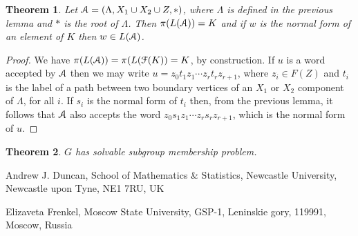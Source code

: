 \documentclass[a4paper,12pt]{article}
\renewcommand{\L}{\Lambda }
\newcommand{\cA}{{\cal{A}}}
\newcommand{\cF}{{\cal{F}}}
\newtheorem{theorem}{Theorem}[section]
\numberwithin{equation}{section}
\numberwithin{figure}{section}
\begin{document}
\begin{theorem}
Let $\cA=(\L,X_1\cup X_2\cup Z,\ast)$, where $\L$ is defined in the previous
lemma and $\ast$ is the root of $\L$. Then $\pi(L(\cA))=K$ and if $w$ is the normal form of an element
of $K$ then $w\in L(\cA)$.
\end{theorem}
\begin{proof}
We have $\pi(L(\cA))=\pi(L(\cF(K))=K$, by construction. If $u$ is a word
accepted by $\cA$ then we may write $u=z_0t_1z_1\cdots z_rt_rz_{r+1}$, where
$z_i\in F(Z)$ and $t_i$ is the label of a path between two boundary
vertices of an $X_1$ or $X_2$ component of $\L$, for all $i$. If
$s_i$ is the normal form of $t_i$ then, from the previous lemma, it follows
that $\cA$ also accepts the word $z_0s_1z_1\cdots z_rs_rz_{r+1}$, which
is the normal form of $u$.
\end{proof}
\begin{theorem}
$G$ has solvable subgroup membership problem.
\end{theorem}



\medskip



\noindent \textsf{Andrew J. Duncan, School of Mathematics \&
Statistics, Newcastle University, Newcastle upon Tyne, NE1 7RU,
UK}



\noindent \textsf{Elizaveta Frenkel, Moscow State University,
GSP-1, Leninskie gory, 119991, Moscow, Russia}

\end{document}
